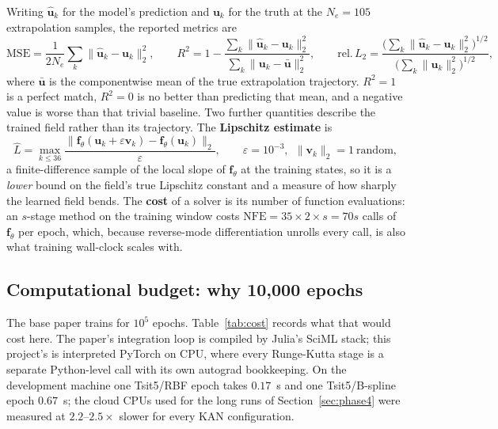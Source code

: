 Writing $\hat{\mathbf{u}}_k$ for the model's prediction and $\mathbf{u}_k$
for the truth at the $N_e=105$ extrapolation samples, the reported metrics are
\begin{equation}
\mathrm{MSE}=\frac{1}{2N_e}\sum_{k}\|\hat{\mathbf{u}}_k-\mathbf{u}_k\|_2^2,\qquad
R^2 = 1-\frac{\sum_k\|\hat{\mathbf{u}}_k-\mathbf{u}_k\|_2^2}{\sum_k\|\mathbf{u}_k-\bar{\mathbf{u}}\|_2^2},\qquad
\text{rel.}\,L_2=\frac{\big(\sum_k\|\hat{\mathbf{u}}_k-\mathbf{u}_k\|_2^2\big)^{1/2}}{\big(\sum_k\|\mathbf{u}_k\|_2^2\big)^{1/2}},
\label{eq:metrics}
\end{equation}
where $\bar{\mathbf{u}}$ is the componentwise mean of the true
extrapolation trajectory. $R^2=1$ is a perfect match, $R^2=0$ is no better
than predicting that mean, and a negative value is worse than that trivial
baseline. Two further quantities describe the trained field rather than its
trajectory. The \textbf{Lipschitz estimate} is
\begin{equation}
\hat L=\max_{k\le 36}\frac{\|\mathbf{f}_\theta(\mathbf{u}_k+\varepsilon\mathbf{v}_k)-\mathbf{f}_\theta(\mathbf{u}_k)\|_2}{\varepsilon},
\qquad \varepsilon=10^{-3},\ \ \|\mathbf{v}_k\|_2=1\ \text{random},
\label{eq:lipschitz}
\end{equation}
a finite-difference sample of the local slope of $\mathbf{f}_\theta$ at the
training states, so it is a \emph{lower} bound on the field's true Lipschitz
constant and a measure of how sharply the learned field bends. The
\textbf{cost} of a solver is its number of function evaluations: an $s$-stage
method on the training window costs $\text{NFE}=35\times2\times s=70s$ calls
of $\mathbf{f}_\theta$ per epoch, which, because reverse-mode differentiation
unrolls every call, is also what training wall-clock scales with.

\subsection{Computational budget: why 10{,}000 epochs}
\label{sec:budget}

The base paper trains for $10^5$ epochs. Table~\ref{tab:cost} records what
that would cost here. The paper's integration loop is compiled by Julia's
SciML stack; this project's is interpreted PyTorch on CPU, where every
Runge-Kutta stage is a separate Python-level call with its own autograd
bookkeeping. On the development machine one Tsit5/RBF epoch takes
$0.17$~s and one Tsit5/B-spline epoch $0.67$~s; the cloud CPUs used for the
long runs of Section~\ref{sec:phase4} were measured at
$2.2$--$2.5\times$ slower for every KAN configuration.

